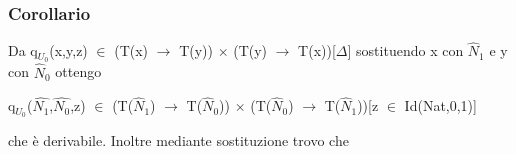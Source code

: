 \subsubsection{Corollario}
Da q$_{U_0}$(x,y,z) $\in$ (T(x) $\rightarrow$ T(y)) $\times$ (T(y) $\rightarrow$ T(x))[$\Delta$] sostituendo x con $\hat{N}_1$ e y con $\hat{N}_0$ ottengo \begin{center} q$_{U_0}$($\hat{N_1}$,$\hat{N_0}$,z) $\in$ (T($\hat{N}_1$) $\rightarrow$ T($\hat{N}_0$)) $\times$ (T($\hat{N}_0$) $\rightarrow$ T($\hat{N}_1$))[z $\in$ Id(Nat,0,1)] \end{center} che \`e derivabile. Inoltre mediante sostituzione trovo che
\scriptsize
\begin{adjustwidth}{-10em}{}
\begin{prooftree}
\end{prooftree}
\end{adjustwidth}

